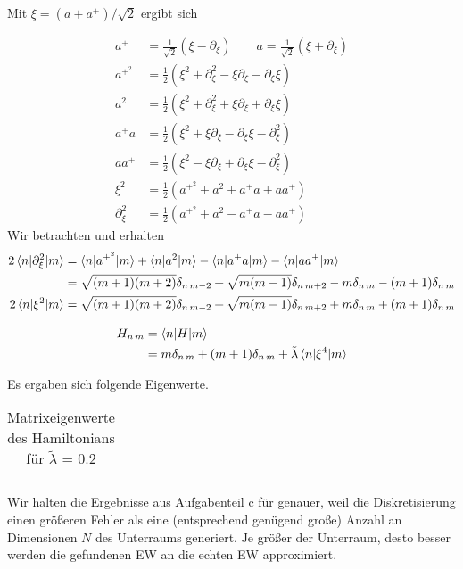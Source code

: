 Mit $\xi = (a+a^+)/\sqrt{2}$ ergibt sich

\begin{align}
	a^+ &= \frac{1}{\sqrt{2}} \left( \xi - \partial_{\xi} \right) \qquad a = \frac{1}{\sqrt{2}} \left( \xi +  \partial_{\xi} \right)\\
	a^{+^2} &= \frac{1}{2} \left( \xi^2 + \partial_{\xi}^2 - \xi \partial_{\xi} - \partial_{\xi} \xi \right) \\
	a^2 &= \frac{1}{2} \left( \xi^2 + \partial_{\xi}^2 + \xi \partial_{\xi} + \partial_{\xi} \xi \right) \\	
	a^+a &= \frac{1}{2} \left( \xi^2 + \xi \partial_{\xi} - \partial_{\xi} \xi - \partial_{\xi}^2 \right) \\
	aa^+ &= \frac{1}{2} \left( \xi^2 - \xi \partial_{\xi} + \partial_{\xi} \xi - \partial_{\xi}^2 \right) \\
	\xi^2 &= \frac{1}{2} \left( a^{+^2} + a^2 + a^+a+aa^+\right) \\
	\partial_{\xi}^2 &= \frac{1}{2} \left( a^{+^2} + a^2 - a^+a-aa^+\right)
\end{align}
Wir betrachten und erhalten
\begin{align}
	 2 \braket{n|\partial_{\xi}^2|m} &= \braket{n|a^{+^2}|m} + \braket{n|a^2|m} - \braket{n|a^+a|m}-\braket{n|aa^+|m} \\
	&= \sqrt{(m+1)(m+2)} \delta_{n\,m-2} + \sqrt{m(m-1)} \delta_{n\,m+2} - m \delta_{n\,m} - (m+1) \delta_{n\,m} \\
	 2 \braket{n|\xi^2|m} &= \sqrt{(m+1)(m+2)} \delta_{n\,m-2} + \sqrt{m(m-1)} \delta_{n\,m+2} + m \delta_{n\,m} + (m+1) \delta_{n\,m}
\end{align}

\begin{align}
	H_{n\,m} &= \braket{n|H|m}\\
			 &= m \delta_{n\,m} + (m+1)\delta_{n\,m}+\tilde{\lambda}\braket{n|\xi^4|m}	
\end{align}

Es ergaben sich folgende Eigenwerte.
\begin{table}[]
\centering
\caption{Matrixeigenwerte des Hamiltonians für $\tilde{\lambda}$ = 0.2}
\label{table:2blambeigenvalues}
\begin{tabular}{c}

\end{tabular}
\end{table}

Wir halten die Ergebnisse aus Aufgabenteil c für genauer, weil die Diskretisierung einen größeren Fehler als eine (entsprechend genügend große) Anzahl an Dimensionen $N$ des Unterraums generiert. Je größer der Unterraum, desto besser werden die gefundenen EW an die echten EW approximiert.


